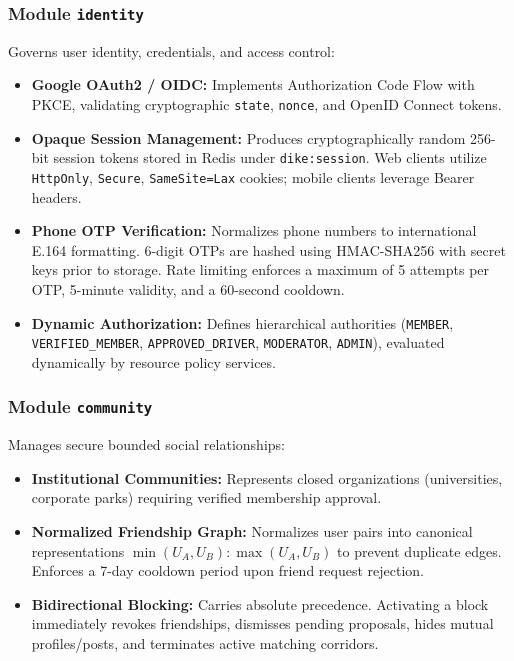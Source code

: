 \documentclass[conference,10pt,a4paper]{IEEEtran}
\begin{document}
\subsubsection{Module \texttt{identity}}
Governs user identity, credentials, and access control:
\begin{itemize}
    \item \textbf{Google OAuth2 / OIDC:} Implements Authorization Code Flow with PKCE, validating cryptographic \texttt{state}, \texttt{nonce}, and OpenID Connect tokens.
    \item \textbf{Opaque Session Management:} Produces cryptographically random 256-bit session tokens stored in Redis under \texttt{dike:session}. Web clients utilize \texttt{HttpOnly}, \texttt{Secure}, \texttt{SameSite=Lax} cookies; mobile clients leverage Bearer headers.
    \item \textbf{Phone OTP Verification:} Normalizes phone numbers to international E.164 formatting. 6-digit OTPs are hashed using HMAC-SHA256 with secret keys prior to storage. Rate limiting enforces a maximum of 5 attempts per OTP, 5-minute validity, and a 60-second cooldown.
    \item \textbf{Dynamic Authorization:} Defines hierarchical authorities (\texttt{MEMBER}, \texttt{VERIFIED\_MEMBER}, \texttt{APPROVED\_DRIVER}, \texttt{MODERATOR}, \texttt{ADMIN}), evaluated dynamically by resource policy services.
\end{itemize}

\subsubsection{Module \texttt{community}}
Manages secure bounded social relationships:
\begin{itemize}
    \item \textbf{Institutional Communities:} Represents closed organizations (universities, corporate parks) requiring verified membership approval.
    \item \textbf{Normalized Friendship Graph:} Normalizes user pairs into canonical representations $\min(U_A, U_B) : \max(U_A, U_B)$ to prevent duplicate edges. Enforces a 7-day cooldown period upon friend request rejection.
    \item \textbf{Bidirectional Blocking:} Carries absolute precedence. Activating a block immediately revokes friendships, dismisses pending proposals, hides mutual profiles/posts, and terminates active matching corridors.
\end{itemize}
\end{document}
